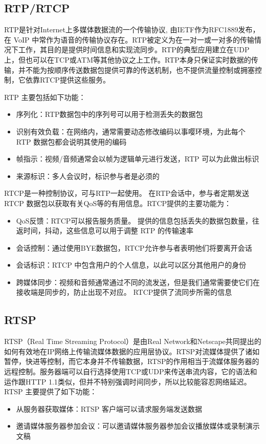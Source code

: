 \documentclass[lang=cn]{elegantpaper}
\begin{document}
\subsection{RTP/RTCP}
RTP\cite{rfc1889}是针对Internet上多媒体数据流的一个传输协议, 由IETF作为RFC1889发布，在 VoIP 中常作为语音的传输协议存在。RTP被定义为在一对一或一对多的传输情况下工作，其目的是提供时间信息和实现流同步。RTP的典型应用建立在UDP上，但也可以在TCP或ATM等其他协议之上工作。RTP本身只保证实时数据的传输，并不能为按顺序传送数据包提供可靠的传送机制，也不提供流量控制或拥塞控制，它依靠RTCP提供这些服务。

RTP 主要包括如下功能：
\begin{itemize}
    \item 序列化：RTP数据包中的序列号可以用于检测丢失的数据包
    \item 识别有效负载：在网络内，通常需要动态修改编码以事嘤环境，为此每个 RTP 数据包都会说明其使用的编码
    \item 帧指示：视频/音频通常会以帧为逻辑单元进行发送，RTP 可以为此做出标识
    \item 来源标识：多人会议时，标识参与者是必须的
\end{itemize}

RTCP是一种控制协议，可与RTP一起使用。 在RTP会话中，参与者定期发送RTCP 数据包以获取有关QoS等的有用信息。RTCP提供的主要功能为：
\begin{itemize}
    \item QoS反馈：RTCP可以报告服务质量。 提供的信息包括丢失的数据包数量，往返时间，抖动，这些信息可以用于调整 RTP 的传输速率
    \item 会话控制：通过使用BYE数据包，RTCP允许参与者表明他们将要离开会话
    \item 会话标识：RTCP 中包含用户的个人信息，以此可以区分其他用户的身份
    \item 跨媒体同步：视频和音频通常通过不同的流发送，但是我们通常需要使它们在接收端是同步的，防止出现不对应。 RTCP提供了流同步所需的信息
\end{itemize}

\subsection{RTSP}
RTSP（Real Time Streaming Protocol）\cite{rfc2326}是由Real Network和Netscape共同提出的如何有效地在IP网络上传输流媒体数据的应用层协议。RTSP对流媒体提供了诸如暂停，快进等控制，而它本身并不传输数据，RTSP的作用相当于流媒体服务器的远程控制。服务器端可以自行选择使用TCP或UDP来传送串流内容，它的语法和运作跟HTTP 1.1类似，但并不特别强调时间同步，所以比较能容忍网络延迟。RTSP 主要提供了如下功能：
\begin{itemize}
    \item 从服务器获取媒体：RTSP 客户端可以请求服务端发送数据
    \item 邀请媒体服务器参加会议：可以邀请媒体服务器参加会议播放媒体或录制演示文稿
\end{itemize}
\end{document}
